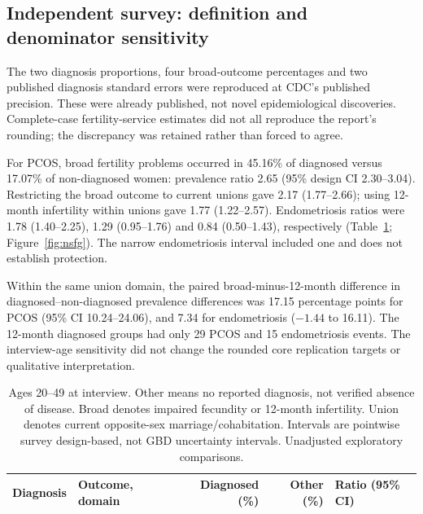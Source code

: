 \subsection{Independent survey: definition and denominator sensitivity}
The two diagnosis proportions, four broad-outcome percentages and two published diagnosis standard errors were reproduced at CDC's published precision. These were already published, not novel epidemiological discoveries. Complete-case fertility-service estimates did not all reproduce the report's rounding; the discrepancy was retained rather than forced to agree.

For PCOS, broad fertility problems occurred in 45.16\% of diagnosed versus 17.07\% of non-diagnosed women: prevalence ratio 2.65 (95\% design CI 2.30--3.04). Restricting the broad outcome to current unions gave 2.17 (1.77--2.66); using 12-month infertility within unions gave 1.77 (1.22--2.57). Endometriosis ratios were 1.78 (1.40--2.25), 1.29 (0.95--1.76) and 0.84 (0.50--1.43), respectively (Table~\ref{tab:nsfg}; Figure~\ref{fig:nsfg}). The narrow endometriosis interval included one and does not establish protection.

Within the same union domain, the paired broad-minus-12-month difference in diagnosed--non-diagnosed prevalence differences was 17.15 percentage points for PCOS (95\% CI 10.24--24.06), and 7.34 for endometriosis ($-1.44$ to 16.11). The 12-month diagnosed groups had only 29 PCOS and 15 endometriosis events. The interview-age sensitivity did not change the rounded core replication targets or qualitative interpretation.

\begin{table}[htbp]\centering\small{}
\caption{Independent NSFG survey estimates under different outcome and denominator definitions.}\label{tab:nsfg}
\setlength{\tabcolsep}{4pt}
\begin{tabular}{llrrl}\toprule
Diagnosis & Outcome, domain & Diagnosed (\%) & Other (\%) & Ratio (95\% CI)\\\midrule
\end{tabular}
\caption*{Ages 20--49 at interview. Other means no reported diagnosis, not verified absence of disease. Broad denotes impaired fecundity or 12-month infertility. Union denotes current opposite-sex marriage/cohabitation. Intervals are pointwise survey design-based, not GBD uncertainty intervals. Unadjusted exploratory comparisons.}
\end{table}
